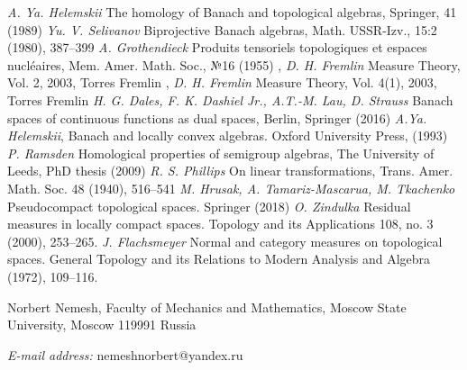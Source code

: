 \documentclass[12pt]{article}
\begin{document}
\begin{thebibliography}{999}
    \textit{A. Ya. Helemskii} The homology of Banach and topological algebras,
    Springer, 41 (1989)
    \textit{Yu. V. Selivanov} Biprojective Banach algebras, Math. USSR-Izv.,
    15:2 (1980), 387–399
    \textit{A. Grothendieck} Produits tensoriels topologiques et espaces
    nucl{\'e}aires, Mem. Amer. Math. Soc., №16 (1955)
    , \textit{D. H. Fremlin} Measure Theory, Vol. 2,
    {2003}, Torres Fremlin
    , \textit{D. H. Fremlin} Measure Theory, Vol. 4(1),
    {2003}, Torres Fremlin
    \textit{H. G. Dales, F. K. Dashiel Jr., A.T.-M. Lau, D. Strauss} Banach
    spaces of continuous functions as dual spaces, Berlin, Springer (2016)
    \textit{A.Ya. Helemskii}, Banach and locally convex algebras. Oxford
    University Press, (1993)
    \textit{P. Ramsden} Homological properties of semigroup algebras, The
    University of Leeds, PhD thesis (2009)
    \textit{R. S. Phillips} On linear transformations, Trans. Amer. Math. Soc.
    48 (1940), 516--541
    \textit{M. Hrusak, A. Tamariz-Mascarua, M. Tkachenko} Pseudocompact
    topological spaces. Springer (2018)
    \textit{O. Zindulka} Residual measures in locally compact spaces. Topology
    and its Applications 108, no. 3 (2000), 253--265.
    \textit{J. Flachsmeyer} Normal and category measures on topological spaces.
    General Topology and its Relations to Modern Analysis and Algebra (1972),
    109--116.
\end{thebibliography}

Norbert Nemesh, Faculty of Mechanics and Mathematics, Moscow State University,
Moscow 119991 Russia

\textit{E-mail address:} nemeshnorbert@yandex.ru
\end{document}
